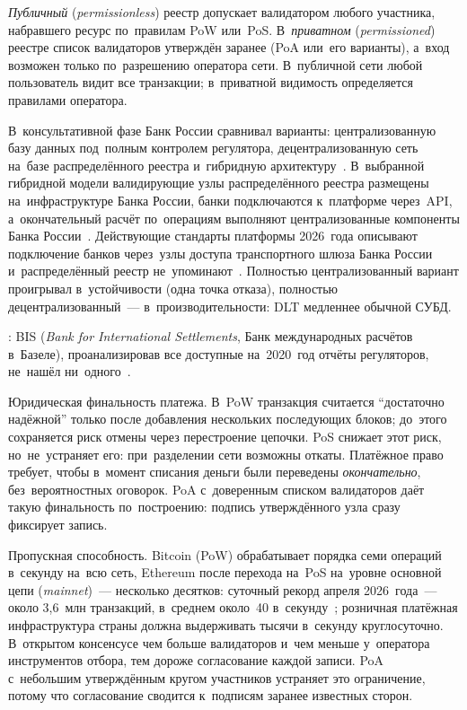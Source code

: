 \emph{Публичный} (\textit{permissionless}) реестр допускает валидатором любого
участника, набравшего ресурс по~правилам PoW или~PoS. В~\emph{приватном}
(\textit{permissioned}) реестре список валидаторов утверждён заранее (PoA или~его
варианты), а~вход возможен только по~разрешению оператора сети. В~публичной сети
любой пользователь видит все транзакции; в~приватной видимость определяется
правилами оператора.

В~консультативной фазе Банк России сравнивал варианты: централизованную базу
данных под~полным контролем регулятора, децентрализованную сеть на~базе
распределённого реестра и~гибридную архитектуру~\cite{cbr-concept-2021}.
В~выбранной гибридной модели валидирующие узлы распределённого реестра размещены
на~инфраструктуре Банка России, банки подключаются к~платформе через~API,
а~окончательный расчёт по~операциям выполняют централизованные компоненты Банка
России~\cite{cbr-concept-2021}. Действующие стандарты платформы 2026~года
описывают подключение банков через~узлы доступа транспортного шлюза Банка
России и~распределённый реестр не~упоминают~\cite{cbr-dr-connect-2026,cbr-dr-otv-2026}. Полностью централизованный вариант проигрывал
в~устойчивости (одна точка отказа), полностью децентрализованный~---
в~производительности: DLT медленнее обычной СУБД.

: BIS (\textit{Bank for International Settlements}, Банк
международных расчётов в~Базеле), проанализировав все доступные на~2020~год
отчёты регуляторов, не~нашёл ни~одного~\cite{bis-wp880-cbdc-architectures}.

Юридическая финальность платежа. В~PoW транзакция считается \enquote{достаточно
надёжной} только после добавления нескольких последующих блоков; до~этого
сохраняется риск отмены через перестроение цепочки. PoS снижает этот риск,
но~не~устраняет его: при~разделении сети возможны откаты.
Платёжное право требует, чтобы в~момент списания деньги были переведены
\emph{окончательно}, без~вероятностных оговорок. PoA с~доверенным
списком валидаторов даёт такую финальность по~построению: подпись утверждённого
узла сразу фиксирует запись.

Пропускная способность. Bitcoin (PoW) обрабатывает порядка семи операций
в~секунду на~всю сеть, Ethereum после перехода на~PoS на~уровне основной цепи
(\textit{mainnet})~--- несколько десятков: суточный рекорд апреля 2026~года~---
около 3,6~млн транзакций, в~среднем около~40 в~секунду~\cite{etherscan-eth-daily-tx}; розничная платёжная инфраструктура
страны должна выдерживать тысячи в~секунду круглосуточно. В~открытом консенсусе
чем больше валидаторов и~чем меньше у~оператора инструментов отбора,
тем дороже согласование каждой записи. PoA с~небольшим утверждённым кругом
участников устраняет это ограничение, потому что согласование сводится к~подписям
заранее известных сторон.

